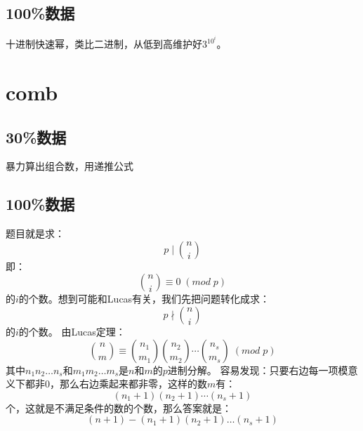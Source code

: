 \documentclass{article}
\begin{document}
		\subsection{100\%数据}
			十进制快速幂，类比二进制，从低到高维护好$3^{10^{i}}$。
		
		\newpage
		
	\section{comb}
		\subsection{30\%数据}
			暴力算出组合数，用递推公式
			
		\subsection{100\%数据}
			题目就是求：
			$$
				p \mid \binom{n}{i}
			$$
			即：
			$$
				\binom{n}{i} \equiv 0 \; ( mod \; p )
			$$
			的$i$的个数。想到可能和Lucas有关，我们先把问题转化成求：
			$$
				p \nmid \binom{n}{i}
			$$
			的$i$的个数。
			由Lucas定理：
			$$
				\binom{n}{m} \equiv \binom{n_1}{m_1}\binom{n_2}{m_2}\cdots\binom{n_s}{m_s}  \; ( mod \; p )
			$$
			其中$n_1n_2\dots n_s$和$m_1m_2\dots m_s$是$n$和$m$的$p$进制分解。
			容易发现：只要右边每一项模意义下都非$0$，那么右边乘起来都非零，这样的数$m$有：
			$$
				(n_1+1)(n_2+1)\cdots(n_s+1)
			$$
			个，这就是不满足条件的数的个数，那么答案就是：
			$$
				(n + 1) - (n_1+1)(n_2+1)\dots(n_s+1)
			$$
			\newpage
	
\end{document}

